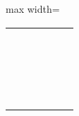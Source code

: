 \begin{exercise}
\begin{table}[H]
\begin{adjustbox}{max width=\textwidth}
\begin{tabular}{|l|l|l|l|l|l|}
                 & & & & & \\
                 & & & & & \\
                 & & & & & \\
                 & & & & & \\
                 & & & & & \\
                 & & & & & \\
                 & & & & & \\
                 & & & & & \\
                 & & & & & \\
                 & & & & & \\
                 & & & & & \\
                 & & & & & \\
                 & & & & & \\
                 & & & & & \\
                 & & & & & \\
                 & & & & & \\
                 & & & & & \\
                 & & & & & \\
                 & & & & & \\
                \bottomrule
            \end{tabular}
        \end{adjustbox}
    \end{table}
\end{exercise}

